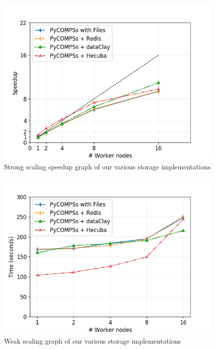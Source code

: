 \begin{figure}[ht!]
\centering
\includegraphics[scale = 0.5]{figures/storage/kmeans_strong_speedup.png}
\caption{Strong scaling speedup graph of our various storage implementations}
\label{fig:kmeans_strong_speedup_redis}
\end{figure}

\begin{figure}[ht!]
\centering
\includegraphics[scale = 0.5]{figures/storage/kmeans_weak.png}
\caption{Weak scaling graph of our various storage implementations}
\label{fig:kmeans_weak_redis}
\end{figure}

